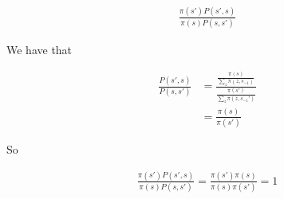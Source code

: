 \documentclass[10pt]{homeworg}
\begin{document}
\begin{align*}
\frac{\pi(s')P(s',s)}{\pi(s)P(s,s')}
\end{align*}

We have that

\begin{align*}
\frac{P(s',s)}{P(s,s')} &= \frac{\frac{\pi(s)}{\sum_z \pi(z,s_{-1})}}{\frac{\pi(s')}{\sum_z \pi(z, s_{-1}')}}\\
					   &= \frac{\pi(s)}{\pi(s')}
\end{align*}

So

\begin{align*}
\frac{\pi(s')P(s',s)}{\pi(s)P(s,s')} = \frac{\pi(s')\pi(s)}{\pi(s)\pi(s')} = 1
\end{align*}
\end{document}
